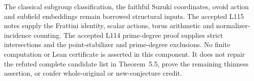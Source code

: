 \documentclass[11pt,a4paper]{article}
\begin{document}
The classical subgroup classification, the faithful Suzuki coordinates,
ovoid action and subfield embeddings remain borrowed structural inputs.
The accepted L115 notes supply the Frattini identity, scalar actions,
torus arithmetic and normalizer-incidence counting. The accepted L114
prime-degree proof supplies strict intersections and the point-stabilizer
and prime-degree exclusions. No finite computation or Lean certificate
is asserted in this component. It does not repair the refuted complete
candidate list in Theorem~5.5, prove the remaining thinness assertion,
or confer whole-original or new-conjecture credit.
\end{document}
